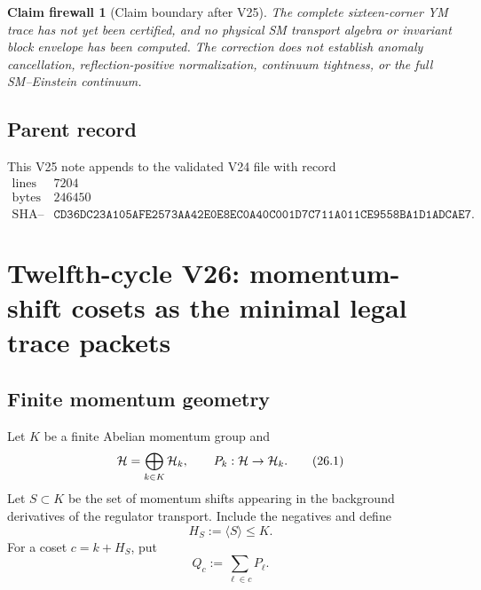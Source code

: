 \documentclass[11pt]{article}
\newtheorem{firewall}[theorem]{Claim firewall}
\theoremstyle{remark}
\begin{document}
\begin{firewall}[Claim boundary after V25]
\label{fire:v12v25-claim}
The complete sixteen-corner YM trace has not yet been certified, and
no physical SM transport algebra or invariant block envelope has
been computed.  The correction does not establish anomaly
cancellation, reflection-positive normalization, continuum
tightness, or the full SM--Einstein continuum.
\end{firewall}

\subsection{Parent record}

This V25 note appends to the validated V24 file with record
\[
\begin{array}{c|c}
\text{lines}&7204\\
\text{bytes}&246450\\
\text{SHA--256}&
\texttt{CD36DC23A105AFE2573AA42E0E8EC0A40C001D7C711A011CE9558BA1D1ADCAE7}.
\end{array}
\]


\section{Twelfth-cycle V26: momentum-shift cosets as the minimal
legal trace packets}
\label{sec:v12v26}

\subsection{Finite momentum geometry}

Let \(K\) be a finite Abelian momentum group and
\[
                         {\cal H}=\bigoplus_{k\in K}{\cal H}_k,
 \qquad P_k:{\cal H}\to{\cal H}_k.                         \tag{26.1}
\]
Let \(S\subset K\) be the set of momentum shifts appearing in the
background derivatives of the regulator transport.  Include the
negatives and define
\[
                         H_S:=\langle S\rangle\le K.         \tag{26.2}
\]
For a coset \(c=k+H_S\), put
\[
                         Q_c:=\sum_{\ell\in c}P_\ell.        \tag{26.3}
\]
\end{document}

